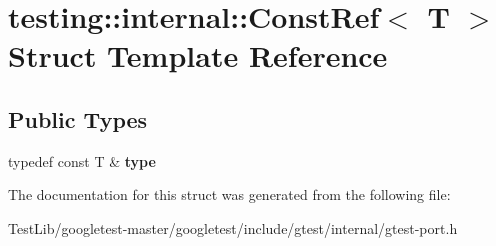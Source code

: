\hypertarget{structtesting_1_1internal_1_1ConstRef}{}\section{testing\+:\+:internal\+:\+:Const\+Ref$<$ T $>$ Struct Template Reference}
\label{structtesting_1_1internal_1_1ConstRef}
\subsection*{Public Types}
\begin{DoxyCompactItemize}
\item 
\mbox{\label{structtesting_1_1internal_1_1ConstRef_a53610a4d0e72958332222b0a85f8937a}} 
typedef const T \& {\bfseries type}
\end{DoxyCompactItemize}


The documentation for this struct was generated from the following file\+:\begin{DoxyCompactItemize}
\item 
Test\+Lib/googletest-\/master/googletest/include/gtest/internal/gtest-\/port.\+h\end{DoxyCompactItemize}
